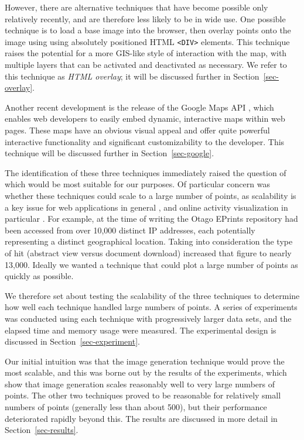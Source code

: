 \documentclass[acmtocl,acmnow]{acmtrans2m}
\begin{document}
However, there are alternative techniques that have become possible only
relatively recently, and are therefore less likely to be in wide use.
One possible technique is to load a base image into the browser, then
overlay points onto the image using using absolutely positioned HTML
\verb|<DIV>| elements. This technique raises the potential for a more
GIS-like style of interaction with the map, with multiple layers that
can be activated and deactivated as necessary.  We refer to this
technique as \emph{HTML overlay}; it will be discussed further in
Section~\ref{sec-overlay}.

Another recent development is the release of the Google Maps API
\cite{Goog-M-2006-maps}, which enables web developers to easily embed
dynamic, interactive maps within web pages. These maps have an obvious
visual appeal and offer quite powerful interactive functionality and
significant customizability to the developer. This technique will be
discussed further in Section~\ref{sec-google}.

The identification of these three techniques immediately raised the
question of which would be most suitable for our purposes. Of particular
concern was whether these techniques could scale to a large number of
points, as scalability is a key issue for web applications in general
\cite[p.\ 28]{Offu-J-2002-quality}, and online activity visualization in
particular \cite[p.\ 50]{Eick-SG-2001-sitevis}. For example, at the time
of writing the Otago EPrints repository had been accessed from over
10,000 distinct IP addresses, each potentially representing a distinct
geographical location. Taking into consideration the type of hit
(abstract view versus document download) increased that figure to nearly
13,000. Ideally we wanted a technique that could plot a large number of
points as quickly as possible.

We therefore set about testing the scalability of the three techniques
to determine how well each technique handled large numbers of points. A
series of experiments was conducted using each technique with
progressively larger data sets, and the elapsed time and memory usage
were measured. The experimental design is discussed in
Section~\ref{sec-experiment}.

Our initial intuition was that the image generation technique would
prove the most scalable, and this was borne out by the results of the
experiments, which show that image generation scales reasonably well to
very large numbers of points. The other two techniques proved to be
reasonable for relatively small numbers of points (generally less than
about 500), but their performance deteriorated rapidly beyond this. The
results are discussed in more detail in Section~\ref{sec-results}.
\end{document}
